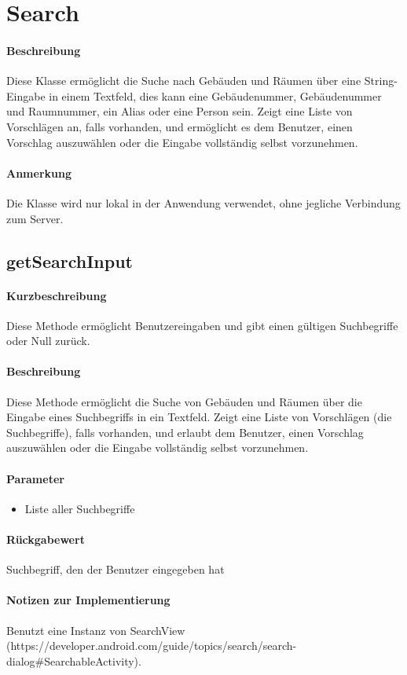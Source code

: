 \section{Search}
\paragraph*{Beschreibung}
Diese Klasse ermöglicht die Suche nach Gebäuden und Räumen über eine String-Eingabe in einem Textfeld, 
dies kann eine Gebäudenummer, Gebäudenummer und Raumnummer, ein Alias oder eine Person sein.
Zeigt eine Liste von Vorschlägen an, falls vorhanden, und ermöglicht es dem Benutzer, einen Vorschlag auszuwählen oder die Eingabe vollständig selbst vorzunehmen.
\paragraph*{Anmerkung}
Die Klasse wird nur lokal in der Anwendung verwendet, ohne jegliche Verbindung zum Server.

\subsection{getSearchInput}%
\paragraph*{Kurzbeschreibung}
Diese Methode ermöglicht Benutzereingaben und gibt einen gültigen Suchbegriffe oder Null zurück.
\paragraph*{Beschreibung}
Diese Methode ermöglicht die Suche von Gebäuden und Räumen über die Eingabe eines Suchbegriffs in ein Textfeld.
Zeigt eine Liste von Vorschlägen (die Suchbegriffe), falls vorhanden, und erlaubt dem Benutzer, einen Vorschlag auszuwählen oder die Eingabe vollständig selbst vorzunehmen.
\paragraph*{Parameter}
\begin{itemize}
    \item Liste aller Suchbegriffe
\end{itemize}
\paragraph*{Rückgabewert}
Suchbegriff, den der Benutzer eingegeben hat
\paragraph*{Notizen zur Implementierung}
Benutzt eine Instanz von SearchView (https://developer.android.com/guide/topics/search/search-dialog#SearchableActivity).

